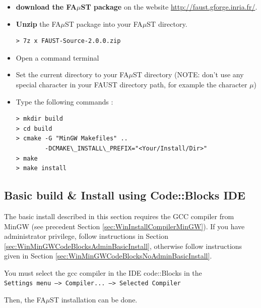 \begin{itemize}
\item \textbf{download the FA$\mu$ST package} on the website  \url{http://faust.gforge.inria.fr/}. 
\item \textbf{Unzip} the FA$\mu$ST package into your FA$\mu$ST directory. 
\begin{lstlisting}
> 7z x FAUST-Source-2.0.0.zip
\end{lstlisting}
\item Open a command terminal
\item Set the current directory to your FA$\mu$ST directory (NOTE: don't use any special character in your FAUST directory path, for example the character $\mu$)
\item Type the following commands : 
\begin{lstlisting}
> mkdir build
> cd build
> cmake -G "MinGW Makefiles" .. 
	    -DCMAKE\_INSTALL\_PREFIX="<Your/Install/Dir>"
> make
> make install 
\end{lstlisting}
\end{itemize}


\subsection{Basic build \& Install using Code::Blocks IDE}
\label{sec:WinCodeBlocksBasicInstall}

The basic install described in this section requires the GCC compiler from MinGW (see precedent Section \ref{sec:WinInstallCompilerMinGW}).
If you have administrator privilege, follow instructions in Section \ref{sec:WinMinGWCodeBlocksAdminBasicInstall}, otherwise follow instructions given in Section \ref{sec:WinMinGWCodeBlocksNoAdminBasicInstall}.

You must select the gcc compiler in the IDE code::Blocks in the \\ \texttt{Settings menu --> Compiler... --> Selected Compiler }  

Then, the FA$\mu$ST installation can be done. 

